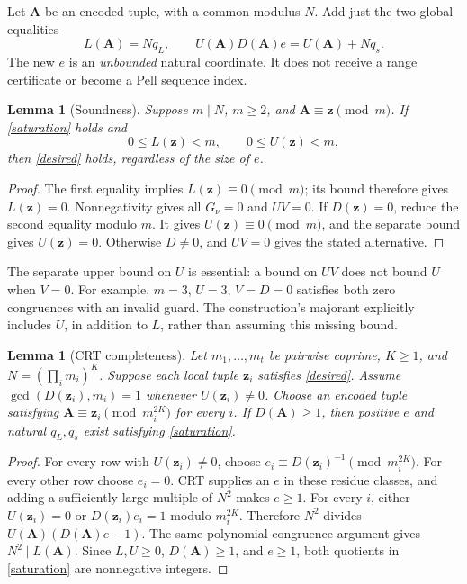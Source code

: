 \documentclass[11pt]{article}
\newtheorem{lemma}[theorem]{Lemma}
\begin{document}
Let $\boldsymbol A$ be an encoded tuple, with a common modulus $N$.
Add just the two global equalities
\begin{equation}\label{saturation}
 L(\boldsymbol A)=Nq_L,\qquad
 U(\boldsymbol A)D(\boldsymbol A)e
   =U(\boldsymbol A)+Nq_s.
\end{equation}
The new $e$ is an \emph{unbounded} natural coordinate. It does not receive
a range certificate or become a Pell sequence index.

\begin{lemma}[Soundness]\label{sound}
Suppose $m\mid N$, $m\ge2$, and
$\boldsymbol A\equiv\boldsymbol z\pmod m$. If \eqref{saturation} holds and
\[
 0\le L(\boldsymbol z)<m,\qquad 0\le U(\boldsymbol z)<m,
\]
then \eqref{desired} holds, regardless of the size of $e$.
\end{lemma}
\begin{proof}
The first equality implies $L(\boldsymbol z)\equiv0\pmod m$; its bound
therefore gives $L(\boldsymbol z)=0$. Nonnegativity gives all $G_\nu=0$
and $UV=0$. If $D(\boldsymbol z)=0$, reduce the second equality modulo $m$.
It gives $U(\boldsymbol z)\equiv0\pmod m$, and the separate bound gives
$U(\boldsymbol z)=0$. Otherwise $D\ne0$, and $UV=0$ gives the stated
alternative.
\end{proof}

The separate upper bound on $U$ is essential: a bound on $UV$ does not bound
$U$ when $V=0$. For example, $m=3$, $U=3$, $V=D=0$ satisfies both zero
congruences with an invalid guard. The construction's majorant explicitly
includes $U$, in addition to $L$, rather than assuming this missing bound.

\begin{lemma}[CRT completeness]\label{complete}
Let $m_1,\ldots,m_t$ be pairwise coprime, $K\ge1$, and
$N=(\prod_i m_i)^K$. Suppose each local tuple $\boldsymbol z_i$ satisfies
\eqref{desired}. Assume $\gcd(D(\boldsymbol z_i),m_i)=1$ whenever
$U(\boldsymbol z_i)\ne0$. Choose an encoded tuple satisfying
$\boldsymbol A\equiv\boldsymbol z_i\pmod{m_i^{2K}}$ for every $i$.
If $D(\boldsymbol A)\ge1$, then positive $e$ and natural $q_L,q_s$ exist
satisfying \eqref{saturation}.
\end{lemma}
\begin{proof}
For every row with $U(\boldsymbol z_i)\ne0$, choose
$e_i\equiv D(\boldsymbol z_i)^{-1}\pmod{m_i^{2K}}$.
For every other row choose $e_i=0$. CRT supplies an $e$ in these residue
classes, and adding a sufficiently large multiple of $N^2$ makes $e\ge1$.
For every $i$, either $U(\boldsymbol z_i)=0$ or $D(\boldsymbol z_i)e_i=1$
modulo $m_i^{2K}$. Therefore $N^2$ divides
$U(\boldsymbol A)(D(\boldsymbol A)e-1)$.
The same polynomial-congruence argument gives $N^2\mid L(\boldsymbol A)$.
Since $L,U\ge0$, $D(\boldsymbol A)\ge1$, and $e\ge1$, both quotients in
\eqref{saturation} are nonnegative integers.
\end{proof}
\end{document}
